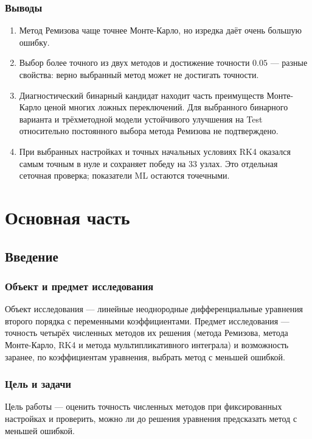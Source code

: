 \documentclass[14pt,a4paper]{extarticle}
\begin{document}
\subsubsection*{Выводы}
\begin{enumerate}
\item Метод Ремизова чаще точнее Монте-Карло, но изредка даёт очень
большую ошибку.
\item Выбор более точного из двух методов и достижение точности $0.05$ ---
разные свойства: верно выбранный метод может не достигать точности.
\item Диагностический бинарный кандидат находит часть преимуществ
Монте-Карло ценой многих ложных переключений. Для выбранного бинарного
варианта и трёхметодной модели устойчивого улучшения на Test
относительно постоянного выбора метода Ремизова не подтверждено.
\item При выбранных настройках и точных начальных условиях RK4
оказался самым точным в нуле и сохраняет победу на 33 узлах.
Это отдельная сеточная проверка; показатели ML остаются точечными.
\end{enumerate}
\endgroup
\clearpage
\tableofcontents
\clearpage

\section{Основная часть}
\subsection{Введение}
\subsubsection{Объект и предмет исследования}
Объект исследования --- линейные неоднородные дифференциальные
уравнения второго порядка с переменными коэффициентами. Предмет
исследования --- точность четырёх численных методов их решения (метода
Ремизова, метода Монте-Карло, RK4 и метода мультипликативного интеграла)
и возможность заранее, по коэффициентам уравнения, выбрать метод
с меньшей ошибкой.

\subsubsection{Цель и задачи}
Цель работы --- оценить точность численных методов при фиксированных
настройках и проверить, можно ли до решения уравнения предсказать метод
с меньшей ошибкой.
\end{document}
